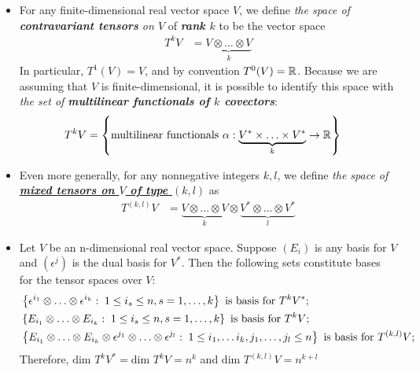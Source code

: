 \documentclass[11pt]{article}
\begin{document}
\begin{itemize}
\item \begin{definition}
For any finite-dimensional real vector space $V$, we define \emph{the space of \textbf{contravariant tensors} on $V$} of \emph{\textbf{rank $k$}} to be the vector space
\begin{align*}
T^{k}V &= \underbrace{V\otimes \ldots \otimes V}_{k}
\end{align*} In particular, $T^1(V) = V$, and by convention $T^0(V) = {\mathbb R}$. Because we are assuming that $V$ is finite-dimensional, it is possible to identify this space with \emph{the set of \textbf{multilinear functionals of $k$ covectors}}:
\begin{align*}
T^{k}V &= \left\{\text{multilinear functionals }\alpha: \underbrace{V^{*}\times \ldots \times V^{*}}_{k} \rightarrow {\mathbb R} \right\}
\end{align*}
\end{definition}

\item \begin{definition}
Even more generally, for any nonnegative integers $k, l$, we define \emph{the space of \underline{\textbf{mixed tensors on $V$ of type $(k,l)$}}} as
\begin{align*}
T^{(k,l)}V &= \underbrace{V\otimes \ldots \otimes V}_{k} \otimes \underbrace{V^{*}\otimes \ldots \otimes V^{*}}_{l}
\end{align*}
\end{definition}

\item \begin{corollary}
Let $V$ be an n-dimensional real vector space. Suppose $(E_i)$ is any basis for $V$ and $(\epsilon^{j})$ is the dual basis for $V^{*}$. Then the following sets constitute
bases for the tensor spaces over $V$:
\begin{align}
&\left\{\epsilon^{i_1} \otimes \ldots \otimes \epsilon^{i_k}: \; 1 \le i_s \le n, s=1,\ldots, k\right\} \text{ is basis for }T^{k}V^{*};  \nonumber\\
&\left\{E_{i_1} \otimes \ldots \otimes E_{i_k}: \; 1 \le i_s \le n, s=1,\ldots, k\right\}   \text{ is basis for }T^{k}V; \nonumber\\
&\left\{E_{i_1} \otimes \ldots \otimes E_{i_k} \otimes \epsilon^{j_1} \otimes \ldots \otimes \epsilon^{j_l}: \; 1 \le i_1, \ldots i_k, j_1,\ldots, j_l \le n\right\} \text{ is basis for }T^{(k, l)}V;  \label{eqn: basis_tensor_space_rank_k}
\end{align}
Therefore, $\text{dim }T^{k}V^{*} = \text{dim }T^{k}V = n^{k}$ and $\text{dim }T^{(k, l)}V = n^{k + l}$
\end{corollary}


\end{itemize}
\end{document}
